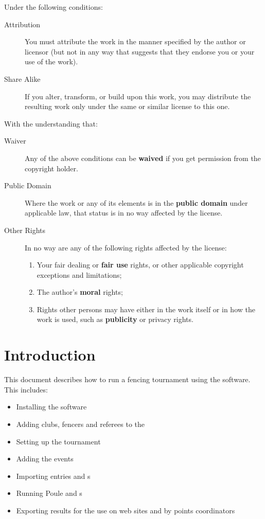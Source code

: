 \documentclass[a4paper,11pt]{memoir}
\begin{document}
Under the following conditions:

\begin{description}
 \item[Attribution] You must attribute the work in the manner specified by the author or licensor (but not in any way that suggests that they endorse you or your use of the work).
 \item[Share Alike] If you alter, transform, or build upon this work, you may distribute the resulting work only under the same or similar license to this one.
\end{description}

With the understanding that:

 \begin{description}
  \item[Waiver] Any of the above conditions can be \textbf{waived} if you get permission from the copyright holder.
  \item[Public Domain] Where the work or any of its elements is in the \textbf{public domain} under applicable law, that status is in no way affected by the license. 
  \item[Other Rights] In no way are any of the following rights affected by the license:
  \begin{enumerate}
   \item Your fair dealing or \textbf{fair use} rights, or other applicable copyright exceptions and limitations;
   \item The author's \textbf{moral} rights;
   \item Rights other persons may have either in the work itself or in how the work is used, such as \textbf{publicity} or privacy rights.
  \end{enumerate}
 \end{description}

\tableofcontents

\listoffigures

\listoftables

\graphicspath{{./screenCaptures/}}

\mainmatter

\chapter{Introduction}

This document describes how to run a fencing tournament using the \fencingtime{} software. This includes:
\begin{itemize}
 \item Installing the software
 \item Adding clubs, fencers and referees to the 
 \item Setting up the tournament
 \item Adding the events
 \item Importing entries and s
 \item Running Poule and s
 \item Exporting results for the use on web sites and by points coordinators
\end{itemize}
\end{document}
